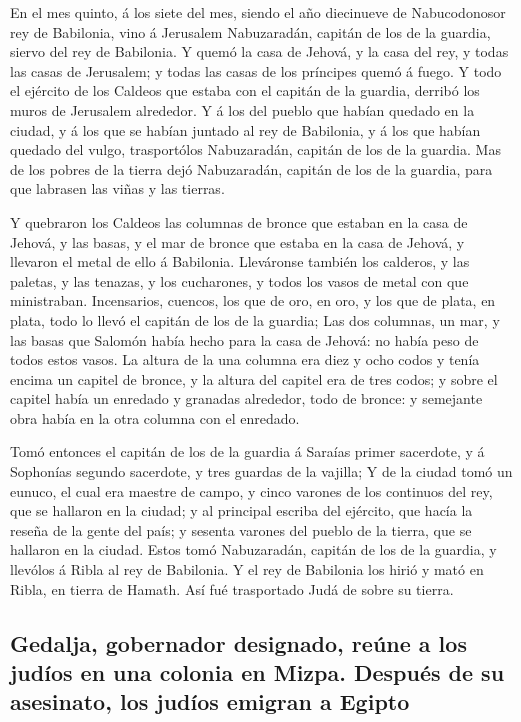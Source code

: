  En el mes quinto, á los siete del mes, siendo el año
diecinueve de Nabucodonosor rey de Babilonia, vino á Jerusalem
Nabuzaradán, capitán de los de la guardia, siervo del rey de Babilonia.
 Y quemó la casa de Jehová, y la casa del rey, y todas las
casas de Jerusalem; y todas las casas de los príncipes quemó á fuego.
 Y todo el ejército de los Caldeos que estaba con el
capitán de la guardia, derribó los muros de Jerusalem alrededor.
 Y á los del pueblo que habían quedado en la ciudad, y á
los que se habían juntado al rey de Babilonia, y á los que habían
quedado del vulgo, trasportólos Nabuzaradán, capitán de los de la
guardia.  Mas de los pobres de la tierra dejó Nabuzaradán,
capitán de los de la guardia, para que labrasen las viñas y las tierras.

 Y quebraron los Caldeos las columnas de bronce que estaban
en la casa de Jehová, y las basas, y el mar de bronce que estaba en la
casa de Jehová, y llevaron el metal de ello á Babilonia. 
Lleváronse también los calderos, y las paletas, y las tenazas, y los
cucharones, y todos los vasos de metal con que ministraban.
 Incensarios, cuencos, los que de oro, en oro, y los que de
plata, en plata, todo lo llevó el capitán de los de la guardia;
 Las dos columnas, un mar, y las basas que Salomón había
hecho para la casa de Jehová: no había peso de todos estos vasos.
 La altura de la una columna era diez y ocho codos y tenía
encima un capitel de bronce, y la altura del capitel era de tres codos;
y sobre el capitel había un enredado y granadas alrededor, todo de
bronce: y semejante obra había en la otra columna con el enredado.

 Tomó entonces el capitán de los de la guardia á Saraías
primer sacerdote, y á Sophonías segundo sacerdote, y tres guardas de la
vajilla;  Y de la ciudad tomó un eunuco, el cual era
maestre de campo, y cinco varones de los continuos del rey, que se
hallaron en la ciudad; y al principal escriba del ejército, que hacía la
reseña de la gente del país; y sesenta varones del pueblo de la tierra,
que se hallaron en la ciudad.  Estos tomó Nabuzaradán,
capitán de los de la guardia, y llevólos á Ribla al rey de Babilonia.
 Y el rey de Babilonia los hirió y mató en Ribla, en tierra
de Hamath. Así fué trasportado Judá de sobre su tierra.

\hypertarget{gedalja-gobernador-designado-reuxfane-a-los-juduxedos-en-una-colonia-en-mizpa.-despuuxe9s-de-su-asesinato-los-juduxedos-emigran-a-egipto}{%
\subsection{Gedalja, gobernador designado, reúne a los judíos en una
colonia en Mizpa. Después de su asesinato, los judíos emigran a
Egipto}\label{gedalja-gobernador-designado-reuxfane-a-los-juduxedos-en-una-colonia-en-mizpa.-despuuxe9s-de-su-asesinato-los-juduxedos-emigran-a-egipto}}

